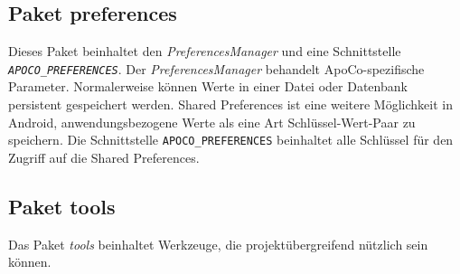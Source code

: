 \subsection*{Paket preferences}

Dieses Paket beinhaltet den \emph{PreferencesManager} und eine Schnittstelle \emph{\texttt{APOCO\_PREFERENCES}}.
Der \emph{PreferencesManager} behandelt ApoCo-spezifische Parameter.
Normalerweise k\"onnen Werte in einer Datei oder Datenbank persistent gespeichert werden.
Shared Preferences ist eine weitere M\"oglichkeit in Android, 
anwendungsbezogene Werte als eine Art Schl\"ussel-Wert-Paar zu speichern.
Die Schnittstelle \texttt{APOCO\_PREFERENCES} beinhaltet alle Schl\"ussel f\"ur den Zugriff auf die Shared Preferences.\\

\subsection*{Paket tools}

Das Paket \emph{tools} beinhaltet Werkzeuge, die projekt\"ubergreifend n\"utzlich sein k\"onnen.

